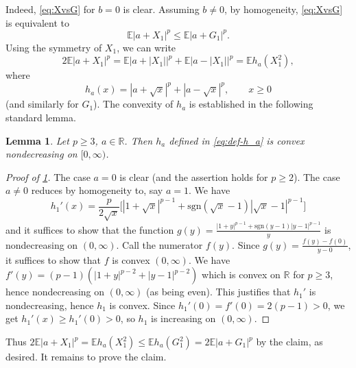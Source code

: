 \documentclass[10pt]{article}
\newcommand{\E}{\mathbb{E}}
\newcommand{\1}{\textbf{1}}
\newcommand{\R}{\mathbb{R}}
\newtheorem{lemma}[theorem]{Lemma}
\theoremstyle{remark}
\theoremstyle{definition}
\begin{document}
\noindent
Indeed, \eqref{eq:XvsG} for $b = 0$ is clear. Assuming $b \neq 0$, by homogeneity, \eqref{eq:XvsG} is equivalent to
\[
\E|a+X_1|^p \leq \E|a+G_1|^p.
\]
Using the symmetry of $X_1$, we can write
\[
2\E|a+X_1|^p = \E|a + |X_1||^p + \E|a-|X_1||^p = \E h_a(X_1^2),
\]
where
\begin{equation}\label{eq:def-h_a}
h_a(x) = |a + \sqrt{x}|^p + |a - \sqrt{x}|^p, \qquad x \geq 0
\end{equation}
(and similarly for $G_1$). The convexity of $h_a$ is established in the following standard lemma.

\begin{lemma}\label{lm:h_a-convex}
Let $p \geq 3$, $a \in \R$. Then $h_a$ defined in \eqref{eq:def-h_a} is convex nondecreasing on $[0,\infty)$.
\end{lemma}
\begin{proof}[Proof of \ref{lm:h_a-convex}]
The case $a = 0$ is clear (and the assertion holds for $p \geq 2$). The case $a \neq 0$ reduces by homogeneity to, say $a = 1$. We have
\[
h_1'(x) = \frac{p}{2\sqrt{x}}\Big[|1+\sqrt{x}|^{p-1}+\text{sgn}(\sqrt{x}-1)|\sqrt{x}-1|^{p-1}\Big]
\]
and it suffices to show that the function $g(y) = \frac{|1+y|^{p-1}+\text{sgn}(y-1)|y-1|^{p-1}}{y}$ is nondecreasing on $(0,\infty)$. Call the numerator $f(y)$. Since $g(y) = \frac{f(y) - f(0)}{y-0}$, it suffices to show that $f$ is convex $(0,\infty)$. We have $f'(y) = (p-1)(|1+y|^{p-2}+|y-1|^{p-2})$ which is convex on $\R$ for $p \geq 3$, hence nondecreasing on $(0,\infty)$ (as being even). This justifies that $h_1'$ is nondecreasing, hence $h_1$ is convex. Since $h_1'(0) = f'(0) = 2(p-1) > 0$, we get $h_1'(x) \geq h_1'(0) > 0$, so $h_1$ is increasing on $(0,\infty)$.
\end{proof}

Thus $2\E|a+X_1|^p = \E h_a(X_1^2) \leq \E h_a(G_1^2) = 2\E|a+G_1|^p$ by the claim, as desired. It remains to prove the claim.
\end{document}
